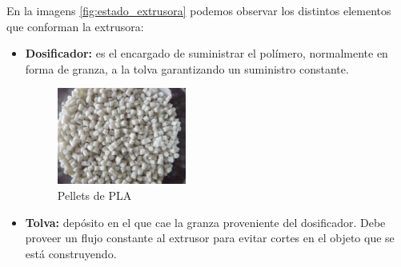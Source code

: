 En la imagens \ref{fig:estado_extrusora} podemos observar los distintos elementos que conforman la extrusora:
\begin{itemize}
    \item \textbf{Dosificador:} es el encargado de suministrar el polímero, normalmente en forma de granza, a la tolva garantizando un suministro constante. 
     \begin{figure}[H]
        \centering
        \includegraphics[width=0.4\textwidth]{images/PLA-Pellets.jpg}
        \caption{Pellets de PLA}
        \label{fig:Pellets de PLA}
    \end{figure}
    \item \textbf{Tolva:} depósito en el que cae la granza proveniente del dosificador. Debe proveer un flujo constante al extrusor para evitar cortes en el objeto que se está construyendo.
   

\end{itemize}
